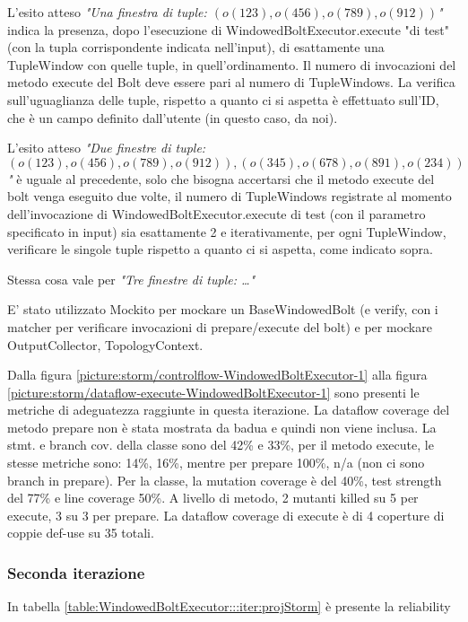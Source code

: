 \documentclass[10pt, a4paper]{article}
\newcommand{\gettablelabel}[5]{table:#1:#2:#3:iter#4:proj#5}
\newcommand{\getreltablelabel}[2]{\gettablelabel{#1}{}{}{}{#2}}
\newcommand{\getpicturelabel}[1]{picture:#1}
\def\storm{Storm}
\begin{document}
	L'esito atteso \textit{"Una finestra di tuple: $(o(123),o(456),o(789),o(912))$"} indica la presenza, dopo l'esecuzione
	di WindowedBoltExecutor.execute "di test" (con la tupla corrispondente indicata nell'input), di esattamente una TupleWindow
	con quelle tuple, in quell'ordinamento. Il numero di invocazioni del metodo execute del Bolt deve essere pari al numero di
	TupleWindows. La verifica sull'uguaglianza delle tuple, rispetto a quanto ci si aspetta è effettuato sull'ID, 
	che è un campo definito dall'utente (in questo caso, da noi).
	
	L'esito atteso \textit{"Due finestre di tuple: $(o(123),o(456),o(789),o(912)),(o(345),o(678),o(891),o(234))$"} è uguale
	al precedente, solo che bisogna accertarsi che il metodo execute del bolt venga eseguito due volte, il numero di 
	TupleWindows registrate al momento dell'invocazione di WindowedBoltExecutor.execute di test (con il parametro specificato
	in input) sia esattamente 2 e iterativamente, per ogni TupleWindow, verificare le singole tuple rispetto a quanto ci si
	aspetta, come indicato sopra.
	
	Stessa cosa vale per \textit{"Tre finestre di tuple: \dots"}
	
	E' stato utilizzato Mockito per mockare un BaseWindowedBolt (e verify, con i matcher per verificare invocazioni di
	prepare/execute del bolt) e per mockare OutputCollector, TopologyContext.
	
	Dalla figura \ref{\getpicturelabel{storm/controlflow-WindowedBoltExecutor-1}} alla figura 
	\ref{\getpicturelabel{storm/dataflow-execute-WindowedBoltExecutor-1}} sono presenti le metriche di adeguatezza 
	raggiunte in questa iterazione. La dataflow coverage del metodo prepare non è stata mostrata da badua e quindi
	non viene inclusa. La stmt. e branch cov. della classe sono del 42\% e 33\%, per il metodo execute, le stesse metriche sono:
	14\%, 16\%, mentre per prepare 100\%, n/a (non ci sono branch in prepare). Per la classe, la mutation coverage è del 40\%,
	test strength del 77\% e line coverage 50\%. A livello di metodo, 2 mutanti killed su 5 per execute, 3 su 3 per prepare.
	La dataflow coverage di execute è di 4 coperture di coppie def-use su 35 totali.
	
	\subsubsection{Seconda iterazione}
	
	In tabella \ref{\getreltablelabel{WindowedBoltExecutor}{\storm}} è presente la reliability
	
\end{document}
